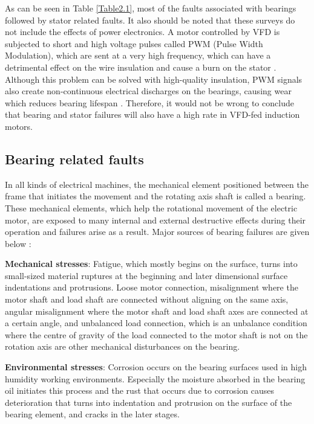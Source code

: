 As can be seen in Table \ref{Table2.1}, most of the faults associated with bearings followed by stator related faults. It also should be noted that these surveys do not include the effects of power electronics. A motor controlled by VFD is subjected to short and high voltage pulses called PWM (Pulse Width Modulation), which are sent at a very high frequency, which can have a detrimental effect on the wire insulation and cause a burn on the stator \cite{gunnar2016}. Although this problem can be solved with high-quality insulation, PWM signals also create non-continuous electrical discharges on the bearings, causing wear which reduces bearing lifespan \cite{trigeassou2013electrical}. Therefore, it would not be wrong to conclude that bearing and stator failures will also have a high rate in VFD-fed induction motors.

\subsection{Bearing related faults}

In all kinds of electrical machines, the mechanical element positioned between the frame that initiates the movement and the rotating axis shaft is called a bearing. These mechanical elements, which help the rotational movement of the electric motor, are exposed to many internal and external destructive effects during their operation and failures arise as a result. Major sources of bearing failures are given below \cite{zhang2010survey,easa,skf,schoen1995motor,en201320958,bonnet2010}:

\textbf{Mechanical stresses}: Fatigue, which mostly begins on the surface, turns into small-sized material ruptures at the beginning and later dimensional surface indentations and protrusions. Loose motor connection, misalignment where the motor shaft and load shaft are connected without aligning on the same axis, angular misalignment where the motor shaft and load shaft axes are connected at a certain angle, and unbalanced load connection, which is an unbalance condition where the centre of gravity of the load connected to the motor shaft is not on the rotation axis are other mechanical disturbances on the bearing.

\textbf{Environmental stresses}: Corrosion occurs on the bearing surfaces used in high humidity working environments. Especially the moisture absorbed in the bearing oil initiates this process and the rust that occurs due to corrosion causes deterioration that turns into indentation and protrusion on the surface of the bearing element, and cracks in the later stages.

